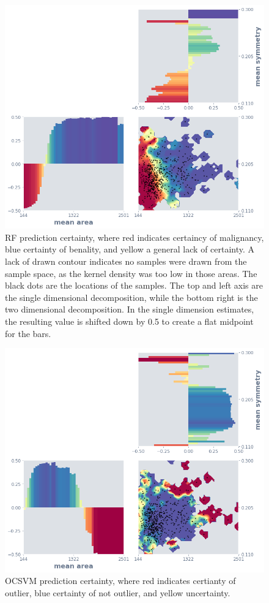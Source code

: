 \documentclass[a4paper, twocolumn]{article}
\begin{document}
\begin{figure}
\centering
\includegraphics[width=0.8\columnwidth]{img/interp_rf.png}
\caption{RF prediction certainty, where red indicates certaincy of malignancy, blue certainty of benality, and yellow a general lack of certainty. A lack of drawn contour indicates no samples were drawn from the sample space, as the kernel density was too low in those areas. The black dots are the locations of the samples. The top and left axis are the single dimensional decomposition, while the bottom right is the two dimensional decomposition. In the single dimension estimates, the resulting value is shifted down by 0.5 to create a flat midpoint for the bars.}
\label{fig:interp-rf}
\end{figure}

\begin{figure}
\centering
\includegraphics[width=0.8\columnwidth]{img/interp_ocsvm.png}
\caption{OCSVM prediction certainty, where red indicates certianty of outlier, blue certainty of not outlier, and yellow uncertainty.}
\label{fig:interp-ocsvm}
\end{figure}
\end{document}
